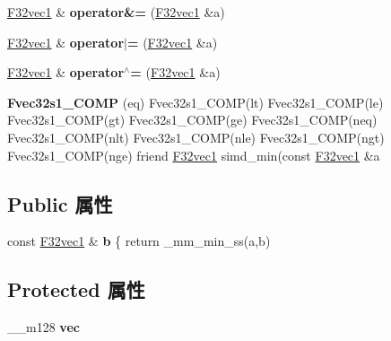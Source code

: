 \begin{DoxyCompactItemize}
\item 
\mbox{\label{class_f32vec1_a5b8f3fec15a24c896ec2c7b54086e3ef}} 
\hyperlink{class_f32vec1}{F32vec1} \& {\bfseries operator\&=} (\hyperlink{class_f32vec1}{F32vec1} \&a)
\item 
\mbox{\label{class_f32vec1_a8a01b843fcda547abfa84a5a81607cc9}} 
\hyperlink{class_f32vec1}{F32vec1} \& {\bfseries operator$\vert$=} (\hyperlink{class_f32vec1}{F32vec1} \&a)
\item 
\mbox{\label{class_f32vec1_a3b57f97579593470b28b7a659e15a361}} 
\hyperlink{class_f32vec1}{F32vec1} \& {\bfseries operator$^\wedge$=} (\hyperlink{class_f32vec1}{F32vec1} \&a)
\item 
\mbox{\label{class_f32vec1_a14d6719070137822bf0dbe5a4fc3efb2}} 
{\bfseries Fvec32s1\+\_\+\+C\+O\+MP} (eq) Fvec32s1\+\_\+\+C\+O\+MP(lt) Fvec32s1\+\_\+\+C\+O\+MP(le) Fvec32s1\+\_\+\+C\+O\+MP(gt) Fvec32s1\+\_\+\+C\+O\+MP(ge) Fvec32s1\+\_\+\+C\+O\+MP(neq) Fvec32s1\+\_\+\+C\+O\+MP(nlt) Fvec32s1\+\_\+\+C\+O\+MP(nle) Fvec32s1\+\_\+\+C\+O\+MP(ngt) Fvec32s1\+\_\+\+C\+O\+MP(nge) friend \hyperlink{class_f32vec1}{F32vec1} simd\+\_\+min(const \hyperlink{class_f32vec1}{F32vec1} \&a
\end{DoxyCompactItemize}
\subsection*{Public 属性}
\begin{DoxyCompactItemize}
\item 
\mbox{\label{class_f32vec1_a5b7f4fc6771f0b9a28ec14fa0d0ddddd}} 
const \hyperlink{class_f32vec1}{F32vec1} \& {\bfseries b} \{ return \+\_\+mm\+\_\+min\+\_\+ss(a,b)
\end{DoxyCompactItemize}
\subsection*{Protected 属性}
\begin{DoxyCompactItemize}
\item 
\mbox{\label{class_f32vec1_a620680843d5672f62ee4c8b507c29213}} 
\+\_\+\+\_\+m128 {\bfseries vec}
\end{DoxyCompactItemize}
